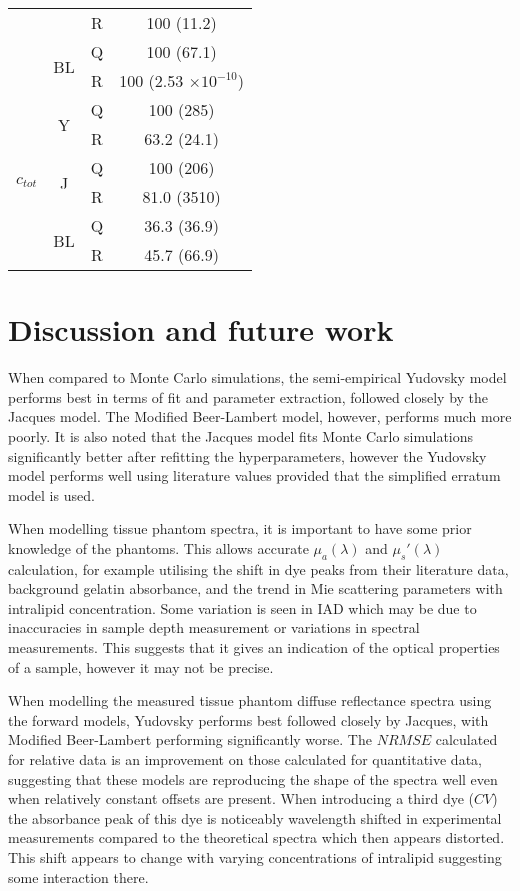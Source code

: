 \begin{table}[htb!]
\begin{tabular}{|ccc|c|}
        & & R & 100 (11.2) \\
        \cline{2-4}
        & \multirow{2}{*}{BL} & Q & 100 (67.1) \\
        & & R & 100 (2.53 $\times 10^{-10}$) \\
        \hline
        \multirow{6}{*}{$c_{tot}$} & \multirow{2}{*}{Y} & Q & 100 (285) \\
        & & R & 63.2 (24.1) \\
        \cline{2-4}
        & \multirow{2}{*}{J} & Q & 100 (206) \\
        & & R & 81.0 (3510) \\
        \cline{2-4}
        & \multirow{2}{*}{BL} & Q & 36.3 (36.9) \\
        & & R & 45.7 (66.9) \\
        \hline
    \end{tabular}
    \label{tb:3phantomparams}
\end{table}

\section{Discussion and future work}\label{sec:discussion}
When compared to Monte Carlo simulations, the semi-empirical Yudovsky model performs best in terms of fit and parameter extraction, followed closely by the Jacques model. The Modified Beer-Lambert model, however, performs much more poorly. It is also noted that the Jacques model fits Monte Carlo simulations significantly better after refitting the hyperparameters, however the Yudovsky model performs well using literature values provided that the simplified erratum model is used. 

When modelling tissue phantom spectra, it is important to have some prior knowledge of the phantoms. This allows accurate $\mu_a(\lambda)$ and $\mu_s'(\lambda)$ calculation, for example utilising the shift in dye peaks from their literature data, background gelatin absorbance, and the trend in Mie scattering parameters with intralipid concentration. Some variation is seen in IAD which may be due to inaccuracies in sample depth measurement or variations in spectral measurements. This suggests that it gives an indication of the optical properties of a sample, however it may not be precise. 

When modelling the measured tissue phantom diffuse reflectance spectra using the forward models, Yudovsky performs best followed closely by Jacques, with Modified Beer-Lambert performing significantly worse. The $NRMSE$ calculated for relative data is an improvement on those calculated for quantitative data, suggesting that these models are reproducing the shape of the spectra well even when relatively constant offsets are present. When introducing a third dye ($CV$) the absorbance peak of this dye is noticeably wavelength shifted in experimental measurements compared to the theoretical spectra which then appears distorted. This shift appears to change with varying concentrations of intralipid suggesting some interaction there. 

